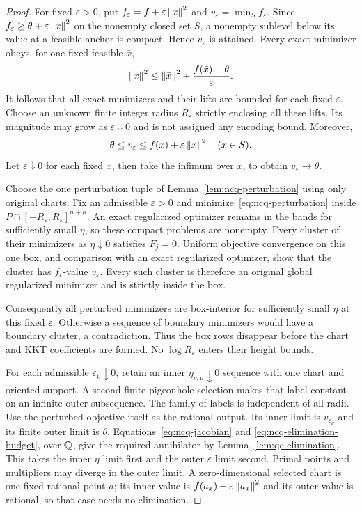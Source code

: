 \begin{proof}
For fixed $\varepsilon>0$, put
$f_\varepsilon=f+\varepsilon\left\lVert x\right\rVert^2$ and
$v_\varepsilon=\min_Sf_\varepsilon$. Since
$f_\varepsilon\ge\theta+\varepsilon\left\lVert x\right\rVert^2$ on the nonempty closed
set $S$, a nonempty sublevel below its value at a feasible anchor is
compact. Hence $v_\varepsilon$ is attained. Every exact minimizer obeys,
for one fixed feasible $\bar x$,
\begin{equation}
\label{eq:ncq-anchor-bound}
 \left\lVert x\right\rVert^2\le\left\lVert\bar x\right\rVert^2+
                     \frac{f(\bar x)-\theta}{\varepsilon}.
\end{equation}
It follows that all exact minimizers and their lifts are bounded for each
fixed $\varepsilon$. Choose an unknown finite integer radius
$R_\varepsilon$ strictly enclosing all these lifts. Its magnitude may
grow as $\varepsilon\downarrow0$ and is not assigned any encoding bound.
Moreover,
\[
 \theta\le v_\varepsilon\le f(x)+\varepsilon\left\lVert x\right\rVert^2
                 \quad(x\in S).
\]
Let $\varepsilon\downarrow0$ for each fixed $x$, then take the infimum
over $x$, to obtain $v_\varepsilon\to\theta$.

Choose the one perturbation tuple of Lemma~\ref{lem:ncq-perturbation}
using only original charts. Fix an admissible $\varepsilon>0$ and
minimize~\eqref{eq:ncq-perturbation} inside
$P\cap[-R_\varepsilon,R_\varepsilon]^{n+h}$. An exact regularized
optimizer remains in the bands for sufficiently small $\eta$, so these
compact problems are nonempty. Every cluster of their minimizers as
$\eta\downarrow0$ satisfies $F_j=0$. Uniform objective convergence on
this one box, and comparison with an exact regularized optimizer, show
that the cluster has $f_\varepsilon$-value $v_\varepsilon$.
Every such cluster is therefore an original global regularized minimizer
and is strictly inside the box.

Consequently all perturbed minimizers are box-interior for sufficiently
small $\eta$ at this fixed $\varepsilon$. Otherwise a sequence of
boundary minimizers would have a boundary cluster, a contradiction. Thus
the box rows disappear before the chart and KKT coefficients are formed.
No $\log R_\varepsilon$ enters their height bounds.

For each admissible $\varepsilon_\nu\downarrow0$, retain an inner
$\eta_{\nu,\mu}\downarrow0$ sequence with one chart and oriented
support. A second finite pigeonhole selection makes that label constant
on an infinite outer subsequence. The family of labels is independent of
all radii. Use the perturbed objective itself as the rational output.
Its inner limit is $v_{\varepsilon_\nu}$ and its finite outer limit is
$\theta$. Equations~\eqref{eq:ncq-jacobian} and
\eqref{eq:ncq-elimination-budget}, over $\mathbb Q$, give the required
annihilator by Lemma~\ref{lem:qc-elimination}. This takes the inner
$\eta$ limit first and the outer $\varepsilon$ limit second. Primal
points and multipliers may diverge in the outer limit. A zero-dimensional
selected chart is one fixed rational point $a$; its inner value is
$f(a_x)+\varepsilon\left\lVert a_x\right\rVert^2$ and its outer value is rational,
so that case needs no elimination.


\end{proof}
